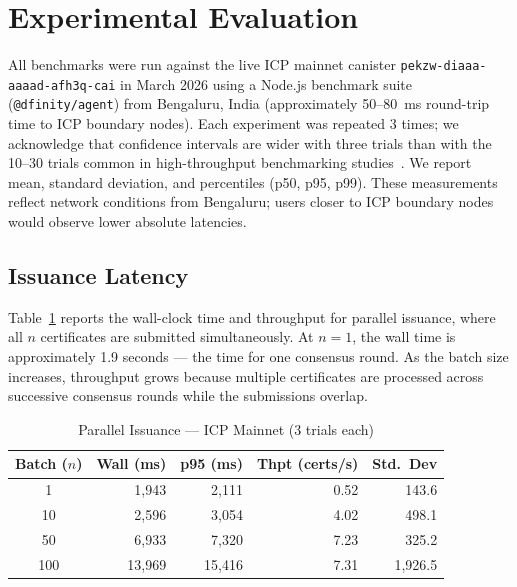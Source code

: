 \documentclass[journal]{IEEEtran}
\begin{document}
\section{Experimental Evaluation}
\label{sec:eval}

All benchmarks were run against the live ICP mainnet canister \texttt{pekzw-diaaa-aaaad-afh3q-cai} in March 2026 using a Node.js benchmark suite (\texttt{@dfinity/agent}) from Bengaluru, India (approximately 50--80~ms round-trip time to ICP boundary nodes). Each experiment was repeated 3 times; we acknowledge that confidence intervals are wider with three trials than with the 10--30 trials common in high-throughput benchmarking studies~\cite{dinh2017blockbench}. We report mean, standard deviation, and percentiles (p50, p95, p99). These measurements reflect network conditions from Bengaluru; users closer to ICP boundary nodes would observe lower absolute latencies.

\subsection{Issuance Latency}

Table~\ref{tab:issuance} reports the wall-clock time and throughput for parallel issuance, where all $n$ certificates are submitted simultaneously. At $n = 1$, the wall time is approximately 1.9 seconds — the time for one consensus round. As the batch size increases, throughput grows because multiple certificates are processed across successive consensus rounds while the submissions overlap.

\begin{table}[t]
\caption{Parallel Issuance --- ICP Mainnet (3 trials each)}
\label{tab:issuance}
\centering\small\renewcommand{\arraystretch}{1.1}
\begin{tabular}{@{}crrrr@{}}
\toprule
\textbf{Batch ($n$)} & \textbf{Wall (ms)} & \textbf{p95 (ms)} & \textbf{Thpt (certs/s)} & \textbf{Std.\ Dev} \\
\midrule
1   & 1{,}943  & 2{,}111  & 0.52 & 143.6 \\
10  & 2{,}596  & 3{,}054  & 4.02 & 498.1 \\
50  & 6{,}933  & 7{,}320  & 7.23 & 325.2 \\
100 & 13{,}969 & 15{,}416 & 7.31 & 1{,}926.5 \\
\bottomrule
\end{tabular}
\end{table}
\end{document}

